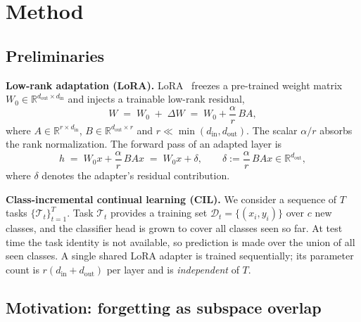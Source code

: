 \section{Method}
\label{sec:method}

\subsection{Preliminaries}
\label{sec:prelim}

\textbf{Low-rank adaptation (LoRA).}
LoRA~\cite{hu2022lora} freezes a pre-trained weight matrix $W_0\in\mathbb{R}^{d_{\text{out}}\times d_{\text{in}}}$
and injects a trainable low-rank residual,
\begin{equation}
W \;=\; W_0 \;+\; \Delta W \;=\; W_0 + \frac{\alpha}{r}\,B A,
\label{eq:lora}
\end{equation}
where $A\in\mathbb{R}^{r\times d_{\text{in}}}$, $B\in\mathbb{R}^{d_{\text{out}}\times r}$
and $r\ll \min(d_{\text{in}},d_{\text{out}})$. The scalar $\alpha/r$ absorbs the rank
normalization. The forward pass of an adapted layer is
\begin{equation}
h \;=\; W_0 x + \frac{\alpha}{r}\,B A x \;=\; W_0 x + \delta,
\qquad \delta := \frac{\alpha}{r}\,B A x \in \mathbb{R}^{d_{\text{out}}},
\label{eq:forward}
\end{equation}
where $\delta$ denotes the adapter's residual contribution.

\textbf{Class-incremental continual learning (CIL).}
We consider a sequence of $T$ tasks $\{\mathcal{T}_t\}_{t=1}^{T}$. Task $\mathcal{T}_t$
provides a training set $\mathcal{D}_t=\{(x_i,y_i)\}$ over $c$ new classes, and the
classifier head is grown to cover all classes seen so far. At test time the task
identity is not available, so prediction is made over the union of all seen classes.
A single shared LoRA adapter is trained sequentially; its parameter count is
$r(d_{\text{in}}+d_{\text{out}})$ per layer and is \emph{independent} of $T$.

\subsection{Motivation: forgetting as subspace overlap}
\label{sec:motivation}

